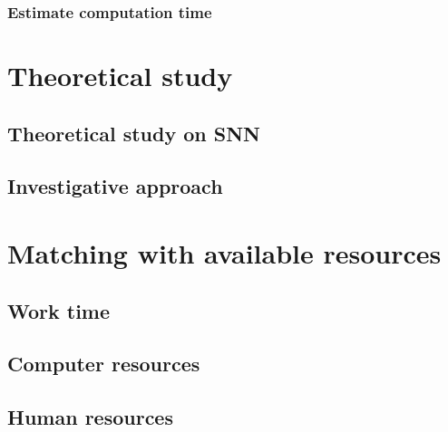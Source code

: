 \documentclass{article}
\begin{document}
\subsubsection{Estimate computation time}

\section{Theoretical study}
\subsection{Theoretical study on SNN}
\subsection{Investigative approach}

\section{Matching with available resources}
\subsection{Work time}
\subsection{Computer resources}
\subsection{Human resources}
\end{document}
